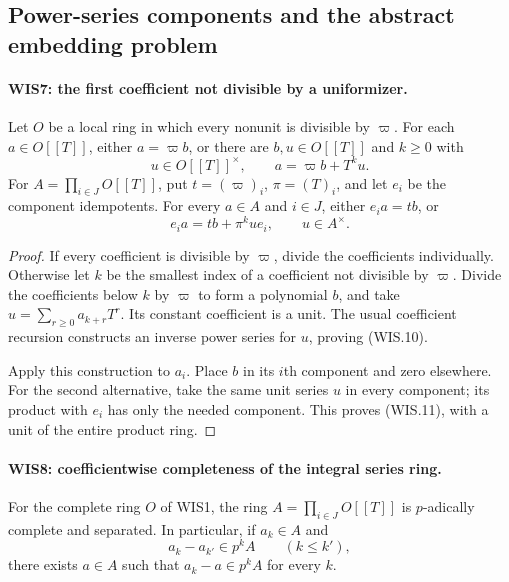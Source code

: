 \subsection{Power-series components and the abstract embedding problem}

\paragraph{WIS7: the first coefficient not divisible by a uniformizer.}
\label{claim:WIS7}
Let $O$ be a local ring in which every nonunit is divisible by
$\varpi$. For each $a\in O[[T]]$, either $a=\varpi b$,
or there are $b,u\in O[[T]]$ and $k\geq0$ with
\[
                    u\in O[[T]]^\times,\qquad
                    a=\varpi b+T^ku.                      \tag{WIS.10}
\]
For $A=\prod_{i\in J}O[[T]]$, put
$t=(\varpi)_i$, $\pi=(T)_i$, and let $e_i$ be the component
idempotents. For every $a\in A$ and $i\in J$, either
$e_i a=tb$, or
\[
                     e_i a=tb+\pi^kue_i,\qquad u\in A^\times.
                                                               \tag{WIS.11}
\]

\begin{proof}
If every coefficient is divisible by $\varpi$, divide
the coefficients individually. Otherwise let $k$ be the
smallest index of a coefficient not divisible by $\varpi$.
Divide the coefficients below $k$ by $\varpi$ to form a
polynomial $b$, and take
$u=\sum_{r\geq0}a_{k+r}T^r$. Its constant coefficient
is a unit. The usual coefficient recursion constructs an
inverse power series for $u$, proving (WIS.10).

Apply this construction to $a_i$. Place $b$ in its $i$th
component and zero elsewhere. For the second alternative,
take the same unit series $u$ in every component; its product
with $e_i$ has only the needed component. This proves
(WIS.11), with a unit of the entire product ring.
\end{proof}

\paragraph{WIS8: coefficientwise completeness of the integral series ring.}
\label{claim:WIS8}
For the complete ring $O$ of WIS1, the ring
$A=\prod_{i\in J}O[[T]]$ is $p$-adically complete and separated.
In particular, if $a_k\in A$ and
\[
           a_k-a_{k'}\in p^kA\qquad(k\leq k'),
                                                               \tag{WIS.12}
\]
there exists $a\in A$ such that $a_k-a\in p^kA$ for every $k$.


